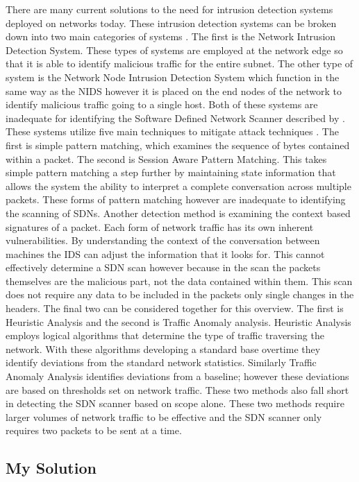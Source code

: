 \documentclass[twocolumn]{article}
\begin{document}
There are many current solutions to the need for intrusion detection systems deployed on networks today. These intrusion detection systems can be broken down into two main categories of systems \cite{SANS}. The first is the Network Intrusion Detection System. These types of systems are employed at the network edge so that it is able to identify malicious traffic for the entire subnet. The other type of system is the Network Node Intrusion Detection System which function in the same way as the NIDS however it is placed on the end nodes of the network to identify malicious traffic going to a single host. Both of these systems are inadequate for identifying the Software Defined Network Scanner described by \cite{Gu13}. These systems utilize five main techniques to mitigate attack techniques \cite{CISCO}. The first is simple pattern matching, which examines the sequence of bytes contained within a packet. The second is Session Aware Pattern Matching. This takes simple pattern matching a step further by maintaining state information that allows the system the ability to interpret a complete conversation across multiple packets. These forms of pattern matching however are inadequate to identifying the scanning of SDNs. Another detection method is examining the context based signatures of a packet. Each form of network traffic has its own inherent vulnerabilities. By understanding the context of the conversation between machines the IDS can adjust the information that it looks for. This cannot effectively determine a SDN scan however because in the scan the packets themselves are the malicious part, not the data contained within them. This scan does not require any data to be included in the packets only single changes in the headers. The final two can be considered together for this overview. The first is Heuristic Analysis and the second is Traffic Anomaly analysis. Heuristic Analysis employs logical algorithms that determine the type of traffic traversing the network. With these algorithms developing a standard base overtime they identify deviations from the standard network statistics. Similarly Traffic Anomaly Analysis identifies deviations from a baseline; however these deviations are based on thresholds set on network traffic. These two methods also fall short in detecting the SDN scanner based on scope alone. These two methods require larger volumes of network traffic to be effective and the SDN scanner only requires two packets to be sent at a time. 

\subsection{My Solution}
\end{document}
